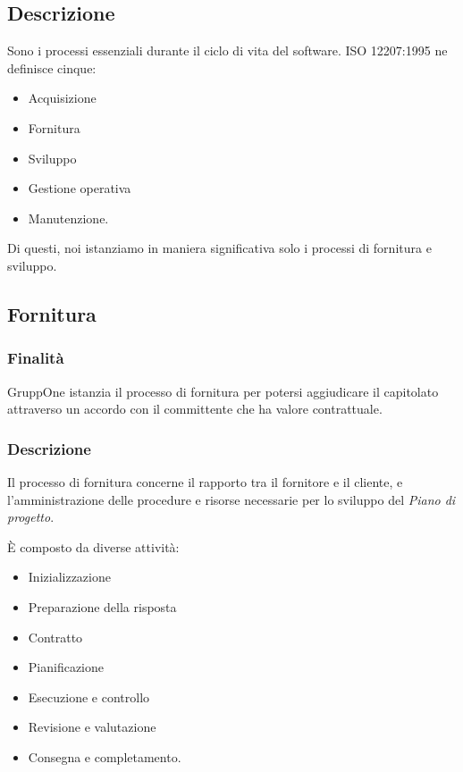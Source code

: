 \documentclass[../norme-di-progetto.tex]{subfiles}
\begin{document}
\subsection{Descrizione}%
\label{sub:processi_primari/descrizione}
Sono i processi essenziali durante il ciclo di vita del software. ISO 12207:1995 ne definisce cinque:

\begin{itemize}
  \item Acquisizione
  \item Fornitura
  \item Sviluppo
  \item Gestione operativa
  \item Manutenzione.
\end{itemize}

Di questi, noi istanziamo in maniera significativa solo i processi di fornitura e sviluppo.

\subsection{Fornitura}%
\label{sub:fornitura}

\subsubsection{Finalità}%
\label{subs:fornitura/finalita}

GruppOne istanzia il processo di fornitura per potersi aggiudicare il capitolato attraverso un accordo con il committente che ha valore contrattuale.

\subsubsection{Descrizione}%
\label{subs:fornitura/descrizione}

Il processo di fornitura concerne il rapporto tra il fornitore e il cliente, e l'amministrazione delle procedure e risorse necessarie per lo sviluppo del \textit{Piano di progetto}.

È composto da diverse attività:

\begin{itemize}
  \item Inizializzazione
  \item Preparazione della risposta
  \item Contratto
  \item Pianificazione
  \item Esecuzione e controllo
  \item Revisione e valutazione
  \item Consegna e completamento.
\end{itemize}
\end{document}
